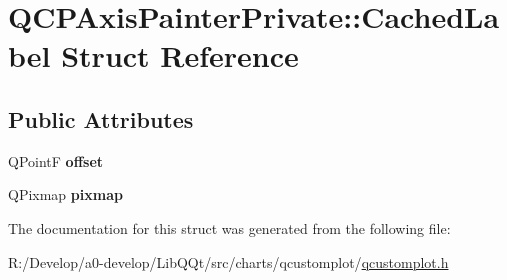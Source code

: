 \hypertarget{struct_q_c_p_axis_painter_private_1_1_cached_label}{}\section{Q\+C\+P\+Axis\+Painter\+Private\+:\+:Cached\+Label Struct Reference}
\label{struct_q_c_p_axis_painter_private_1_1_cached_label}
\subsection*{Public Attributes}
\begin{DoxyCompactItemize}
\item 
\mbox{\label{struct_q_c_p_axis_painter_private_1_1_cached_label_a5f502db71c92e572f1e6f44f62c59d8e}} 
Q\+PointF {\bfseries offset}
\item 
\mbox{\label{struct_q_c_p_axis_painter_private_1_1_cached_label_a461597cbd470914a9d24b64d16037a88}} 
Q\+Pixmap {\bfseries pixmap}
\end{DoxyCompactItemize}


The documentation for this struct was generated from the following file\+:\begin{DoxyCompactItemize}
\item 
R\+:/\+Develop/a0-\/develop/\+Lib\+Q\+Qt/src/charts/qcustomplot/\mbox{\hyperlink{qcustomplot_8h}{qcustomplot.\+h}}\end{DoxyCompactItemize}
